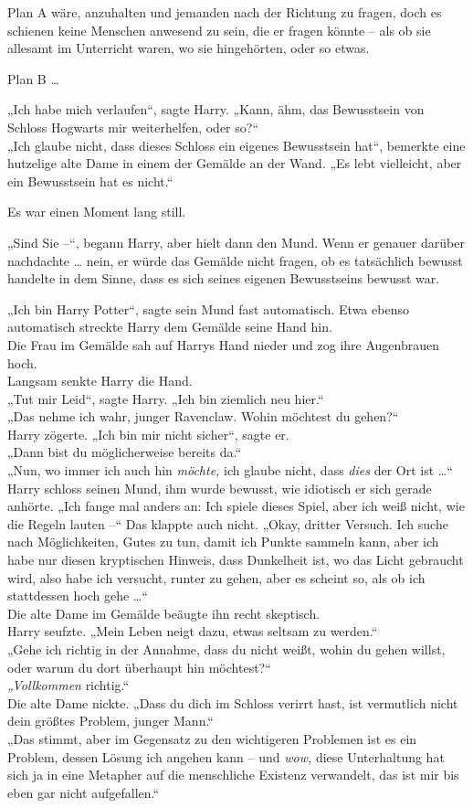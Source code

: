 {Plan A wäre, anzuhalten und jemanden nach der Richtung zu fragen, doch es schienen keine Menschen anwesend zu sein, die er fragen könnte -- als ob sie allesamt im Unterricht waren, wo sie hingehörten, oder so etwas.

Plan B …

„Ich habe mich verlaufen“, sagte Harry. „Kann, ähm, das Bewusstsein von Schloss Hogwarts mir weiterhelfen, oder so?“\\ „Ich glaube nicht, dass dieses Schloss ein eigenes Bewusstsein hat“, bemerkte eine hutzelige alte Dame in einem der Gemälde an der Wand. „Es lebt vielleicht, aber ein Bewusstsein hat es nicht.“

Es war einen Moment lang still.

„Sind Sie --“, begann Harry, aber hielt dann den Mund. Wenn er genauer darüber nachdachte … nein, er würde das Gemälde nicht fragen, ob es tatsächlich bewusst handelte in dem Sinne, dass es sich seines eigenen Bewusstseins bewusst war.

„Ich bin Harry Potter“, sagte sein Mund fast automatisch. Etwa ebenso automatisch streckte Harry dem Gemälde seine Hand hin.\\ Die Frau im Gemälde sah auf Harrys Hand nieder und zog ihre Augenbrauen hoch.\\ Langsam senkte Harry die Hand.\\ „Tut mir Leid“, sagte Harry. „Ich bin ziemlich neu hier.“\\ „Das nehme ich wahr, junger Ravenclaw. Wohin möchtest du gehen?“\\ Harry zögerte. „Ich bin mir nicht sicher“, sagte er.\\ „Dann bist du möglicherweise bereits da.“\\ „Nun, wo immer ich auch hin \emph{möchte,} ich glaube nicht, dass \emph{dies} der Ort ist …“ Harry schloss seinen Mund, ihm wurde bewusst, wie idiotisch er sich gerade anhörte. „Ich fange mal anders an: Ich spiele dieses Spiel, aber ich weiß nicht, wie die Regeln lauten --“ Das klappte auch nicht. „Okay, dritter Versuch. Ich suche nach Möglichkeiten, Gutes zu tun, damit ich Punkte sammeln kann, aber ich habe nur diesen kryptischen Hinweis, dass Dunkelheit ist, wo das Licht gebraucht wird, also habe ich versucht, runter zu gehen, aber es scheint so, als ob ich stattdessen hoch gehe …“\\ Die alte Dame im Gemälde beäugte ihn recht skeptisch.\\ Harry seufzte. „Mein Leben neigt dazu, etwas seltsam zu werden.“\\ „Gehe ich richtig in der Annahme, dass du nicht weißt, wohin du gehen willst, oder warum du dort überhaupt hin möchtest?“\\ \emph{„Vollkommen} richtig.“\\ Die alte Dame nickte. „Dass du dich im Schloss verirrt hast, ist vermutlich nicht dein größtes Problem, junger Mann.“\\ „Das stimmt, aber im Gegensatz zu den wichtigeren Problemen ist es ein Problem, dessen Lösung ich angehen kann -- und \emph{wow,} diese Unterhaltung hat sich ja in eine Metapher auf die menschliche Existenz verwandelt, das ist mir bis eben gar nicht aufgefallen.“

}

